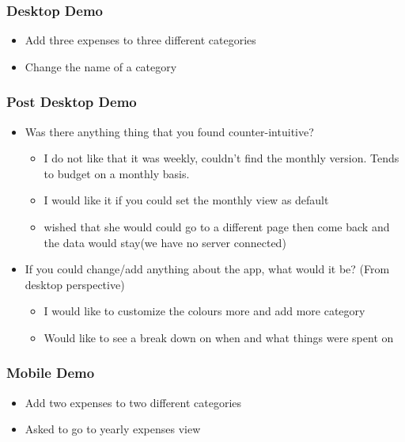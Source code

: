 \documentclass{chi2011}
\begin{document}
	\subsubsection{Desktop Demo}
	\begin{itemize}[noitemsep] 
		\item Add three expenses to three different categories
		\item Change the name of a category
	\end{itemize}
	
	\subsubsection{Post Desktop Demo}
	\begin{itemize}[noitemsep]
		\item Was there anything thing that you found counter-intuitive?
		\begin{itemize}[noitemsep]
			\item I do not like that it was weekly, couldn't find the monthly version. Tends to
			 budget on a monthly basis. 
			\item I would like it if you could set the monthly view as default
			\item wished that she would could go to a different page then come back and the
			data would stay(we have no server connected)
		\end{itemize}
		\item If you could change/add anything about the app, what would it be? (From desktop perspective)
		\begin{itemize}[noitemsep]
				\item I would like to customize the colours more and add more
					category
				\item  Would like to see a break down on when and what things were spent on
		\end{itemize}
	\end{itemize}
	
	\subsubsection{Mobile Demo}
	\begin{itemize}[noitemsep] 
		\item Add two expenses to two different categories
		\item Asked to go to yearly expenses view
	\end{itemize}
\end{document}
